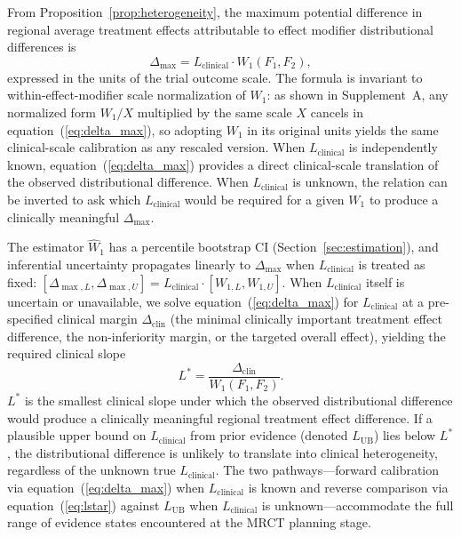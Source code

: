 \documentclass[AMA,Times1COL]{WileyNJDv5}
\begin{document}
From Proposition~\ref{prop:heterogeneity}, the maximum potential difference in regional average treatment effects attributable to effect modifier distributional differences is
\begin{equation}
\Delta_{\max} = L_{\text{clinical}} \cdot W_1(F_1, F_2),
\label{eq:delta_max}
\end{equation}
expressed in the units of the trial outcome scale. The formula is invariant to within-effect-modifier scale normalization of $W_1$: as shown in Supplement~A, any normalized form $W_1 / X$ multiplied by the same scale $X$ cancels in equation~(\ref{eq:delta_max}), so adopting $W_1$ in its original units yields the same clinical-scale calibration as any rescaled version. When $L_{\text{clinical}}$ is independently known, equation~(\ref{eq:delta_max}) provides a direct clinical-scale translation of the observed distributional difference. When $L_{\text{clinical}}$ is unknown, the relation can be inverted to ask which $L_{\text{clinical}}$ would be required for a given $W_1$ to produce a clinically meaningful $\Delta_{\max}$.

The estimator $\widehat{W}_1$ has a percentile bootstrap CI (Section~\ref{sec:estimation}), and inferential uncertainty propagates linearly to $\Delta_{\max}$ when $L_{\text{clinical}}$ is treated as fixed: $[\Delta_{\max,L}, \Delta_{\max,U}] = L_{\text{clinical}} \cdot [W_{1,L}, W_{1,U}]$. When $L_{\text{clinical}}$ itself is uncertain or unavailable, we solve equation~(\ref{eq:delta_max}) for $L_{\text{clinical}}$ at a pre-specified clinical margin $\Delta_{\text{clin}}$ (the minimal clinically important treatment effect difference, the non-inferiority margin, or the targeted overall effect), yielding the required clinical slope
\begin{equation}
L^* = \frac{\Delta_{\text{clin}}}{W_1(F_1, F_2)}.
\label{eq:lstar}
\end{equation}
$L^*$ is the smallest clinical slope under which the observed distributional difference would produce a clinically meaningful regional treatment effect difference. If a plausible upper bound on $L_{\text{clinical}}$ from prior evidence (denoted $L_{\text{UB}}$) lies below $L^*$, the distributional difference is unlikely to translate into clinical heterogeneity, regardless of the unknown true $L_{\text{clinical}}$. The two pathways---forward calibration via equation~(\ref{eq:delta_max}) when $L_{\text{clinical}}$ is known and reverse comparison via equation~(\ref{eq:lstar}) against $L_{\text{UB}}$ when $L_{\text{clinical}}$ is unknown---accommodate the full range of evidence states encountered at the MRCT planning stage.
\end{document}

